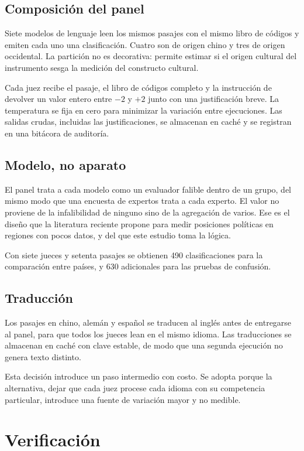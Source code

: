 \subsection{Composición del panel}

Siete modelos de lenguaje leen los mismos pasajes con el mismo libro de códigos y emiten cada uno una clasificación. Cuatro son de origen chino y tres de origen occidental. La partición no es decorativa: permite estimar si el origen cultural del instrumento sesga la medición del constructo cultural.

Cada juez recibe el pasaje, el libro de códigos completo y la instrucción de devolver un valor entero entre $-2$ y $+2$ junto con una justificación breve. La temperatura se fija en cero para minimizar la variación entre ejecuciones. Las salidas crudas, incluidas las justificaciones, se almacenan en caché y se registran en una bitácora de auditoría.

\subsection{Modelo, no aparato}

El panel trata a cada modelo como un evaluador falible dentro de un grupo, del mismo modo que una encuesta de expertos trata a cada experto. El valor no proviene de la infalibilidad de ninguno sino de la agregación de varios. Ese es el diseño que la literatura reciente propone para medir posiciones políticas en regiones con pocos datos, y del que este estudio toma la lógica.

Con siete jueces y setenta pasajes se obtienen 490 clasificaciones para la comparación entre países, y 630 adicionales para las pruebas de confusión.

\subsection{Traducción}

Los pasajes en chino, alemán y español se traducen al inglés antes de entregarse al panel, para que todos los jueces lean en el mismo idioma. Las traducciones se almacenan en caché con clave estable, de modo que una segunda ejecución no genera texto distinto.

Esta decisión introduce un paso intermedio con costo. Se adopta porque la alternativa, dejar que cada juez procese cada idioma con su competencia particular, introduce una fuente de variación mayor y no medible.

\section{Verificación}
\label{sec:acuerdo}

